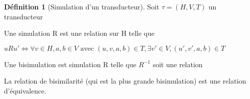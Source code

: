\documentclass{scrartcl}
\theoremstyle{definition}
\newtheorem{definition}{Définition}
\theoremstyle{remark}
\begin{document}
\begin{definition}[Simulation d'un transducteur]

Soit $\tau = (H,V,T)$ un transducteur

Une simulation R est une relation sur H telle que 
    
$uRu' \iff \forall v \in H, a,b \in V \text{ avec } (u,v,a,b) \in T, \exists v' \in V, (u',v',a,b) \in T$

Une bisimulation est simulation R telle que $R^{-1}$ soit une relation

La relation de bisimilarité (qui est la plus grande bisimulation) est une relation d'équivalence.

\end{definition}
\end{document}
